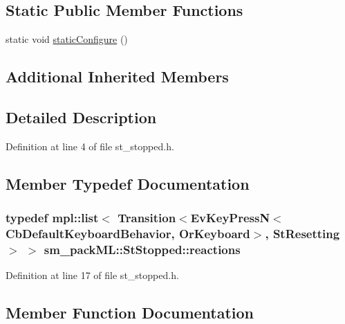 \subsection*{Static Public Member Functions}
\begin{DoxyCompactItemize}
\item 
static void \hyperlink{structsm__packML_1_1StStopped_a8dd4d55800d1eaae7a27375b46f2b508}{static\+Configure} ()
\end{DoxyCompactItemize}
\subsection*{Additional Inherited Members}


\subsection{Detailed Description}


Definition at line 4 of file st\+\_\+stopped.\+h.



\subsection{Member Typedef Documentation}
\subsubsection[{\texorpdfstring{reactions}{reactions}}]{\setlength{\rightskip}{0pt plus 5cm}typedef mpl\+::list$<$ Transition$<$Ev\+Key\+PressN$<$Cb\+Default\+Keyboard\+Behavior, {\bf Or\+Keyboard}$>$, {\bf St\+Resetting}$>$ $>$ {\bf sm\+\_\+pack\+M\+L\+::\+St\+Stopped\+::reactions}}\hypertarget{structsm__packML_1_1StStopped_a349f46672e4136c4dc2e451b7ecad699}{}\label{structsm__packML_1_1StStopped_a349f46672e4136c4dc2e451b7ecad699}


Definition at line 17 of file st\+\_\+stopped.\+h.



\subsection{Member Function Documentation}
